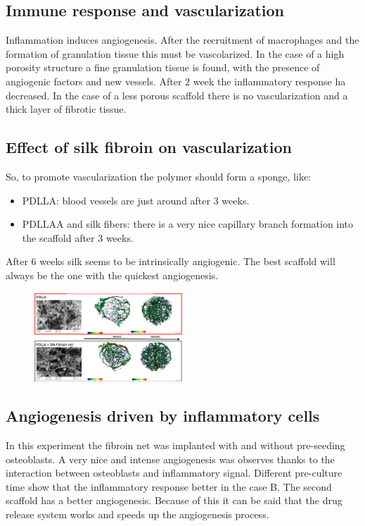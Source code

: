 	\subsection{Immune response and vascularization}
	Inflammation induces angiogenesis.
	After the recruitment of macrophages and the formation of granulation tissue this must be vascolarized.
	In the case of a high porosity structure a fine granulation tissue is found, with the presence of angiogenic factors and new vessels.
	After $2$ week the inflammatory response ha decreased.
	In the case of a less porous scaffold there is no vascularization and a thick layer of fibrotic tissue.

	\subsection{Effect of silk fibroin on vascularization}
	So, to promote vascularization the polymer should form a sponge, like:

	\begin{multicols}{2}
		\begin{itemize}
			\item PDLLA: blood vessels are just around after $3$ weeks.
			\item PDLLAA and silk fibers: there is a very nice capillary branch formation into the scaffold after $3$ weeks.
		\end{itemize}
	\end{multicols}

	After 6 weeks silk seems to be intrinsically angiogenic.
	The best scaffold will always be the one with the quickest angiogenesis.

	\begin{figure}[h]
		\centering
		\includegraphics[width=0.5\textwidth]{pdlla}
		\caption{\label{fig:pdlla}}
	\end{figure}


	\subsection{Angiogenesis driven by inflammatory cells}
	In this experiment the fibroin net was implanted with and without pre-seeding osteoblasts.
	A very nice and intense angiogenesis was observes thanks to the interaction between osteoblasts and inflammatory signal.
	Different pre-culture time show that the inflammatory response better in the case B.
	The second scaffold has a better angiogenesis.
	Because of this it can be said that the drug release system works and speeds up the angiogenesis process.

